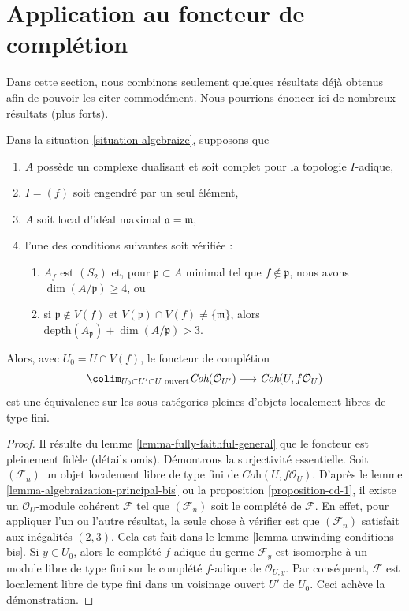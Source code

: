\section{Application au foncteur de complétion}
\label{section-completion-application}

\noindent
Dans cette section, nous combinons seulement quelques résultats déjà obtenus
afin de pouvoir les citer commodément. Nous pourrions énoncer ici de nombreux
résultats (plus forts).

\begin{lemma}
\label{lemma-equivalence-better}
Dans la situation \ref{situation-algebraize}, supposons que
\begin{enumerate}
\item $A$ possède un complexe dualisant et soit complet pour la topologie $I$-adique,
\item $I = (f)$ soit engendré par un seul élément,
\item $A$ soit local d'idéal maximal $\mathfrak a = \mathfrak m$,
\item l'une des conditions suivantes soit vérifiée :
\begin{enumerate}
\item $A_f$ est $(S_2)$ et, pour $\mathfrak p \subset A$
minimal tel que $f \not \in \mathfrak p$, nous avons $\dim(A/\mathfrak p) \geq 4$, ou
\item si $\mathfrak p \not \in V(f)$ et
$V(\mathfrak p) \cap V(f) \not = \{\mathfrak m\}$, alors
$\text{depth}(A_\mathfrak p) + \dim(A/\mathfrak p) > 3$.
\end{enumerate}
\end{enumerate}
Alors, avec $U_0 = U \cap V(f)$, le foncteur de complétion
$$
\colim_{U_0 \subset U' \subset U\text{ ouvert}}
\textit{Coh}(\mathcal{O}_{U'})
\longrightarrow
\textit{Coh}(U, f\mathcal{O}_U)
$$
est une équivalence sur les sous-catégories pleines d'objets localement libres de type fini.
\end{lemma}

\begin{proof}
Il résulte du lemme \ref{lemma-fully-faithful-general}
que le foncteur est pleinement fidèle (détails omis).
Démontrons la surjectivité essentielle. Soit $(\mathcal{F}_n)$ un objet localement
libre de type fini de $\textit{Coh}(U, f\mathcal{O}_U)$. D'après le
lemme \ref{lemma-algebraization-principal-bis} ou la
proposition \ref{proposition-cd-1},
il existe un $\mathcal{O}_U$-module cohérent $\mathcal{F}$
tel que $(\mathcal{F}_n)$ soit le complété de $\mathcal{F}$.
En effet, pour appliquer l'un ou l'autre résultat, la seule chose à
vérifier est que $(\mathcal{F}_n)$ satisfait aux inégalités $(2, 3)$.
Cela est fait dans le lemme \ref{lemma-unwinding-conditions-bis}. Si $y \in U_0$,
alors le complété $f$-adique du germe $\mathcal{F}_y$ est isomorphe à
un module libre de type fini sur le complété $f$-adique de $\mathcal{O}_{U, y}$.
Par conséquent, $\mathcal{F}$ est localement libre de type fini dans un voisinage ouvert
$U'$ de $U_0$. Ceci achève la démonstration.
\end{proof}

